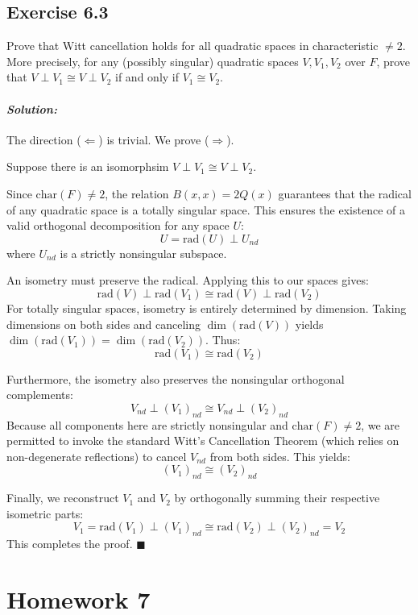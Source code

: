 \documentclass[12pt, a4paper]{article}
\newenvironment{solution}
  {\paragraph{\textit{Solution:}}\par\medskip}
  {\hfill$\blacksquare$\vspace{0.1cm}}
\begin{document}
\subsection*{Exercise 6.3}
Prove that Witt cancellation holds for all quadratic spaces in characteristic $\neq 2$. More precisely, for any (possibly singular) quadratic spaces $V, V_1, V_2$ over $F$, prove that $V \perp V_1 \cong V \perp V_2$ if and only if $V_1 \cong V_2$.
\begin{solution}
The direction ($\Longleftarrow$) is trivial. We prove ($\Longrightarrow$).

Suppose there is an isomorphsim $V \perp V_1 \cong V \perp V_2$.

Since $\mathrm{char}(F) \neq 2$, the relation $B(x,x) = 2Q(x)$ guarantees that the radical of any quadratic space is a totally singular space. This ensures the existence of a valid orthogonal decomposition for any space $U$:
\[ U = \mathrm{rad}(U) \perp U_{nd} \]
where $U_{nd}$ is a strictly nonsingular subspace.

An isometry must preserve the radical. Applying this to our spaces gives:
\[ \mathrm{rad}(V) \perp \mathrm{rad}(V_1) \cong \mathrm{rad}(V) \perp \mathrm{rad}(V_2) \]
For totally singular spaces, isometry is entirely determined by dimension. Taking dimensions on both sides and canceling $\dim(\mathrm{rad}(V))$ yields $\dim(\mathrm{rad}(V_1)) = \dim(\mathrm{rad}(V_2))$. Thus:
\[ \mathrm{rad}(V_1) \cong \mathrm{rad}(V_2) \]

Furthermore, the isometry also preserves the nonsingular orthogonal complements:
\[ V_{nd} \perp (V_1)_{nd} \cong V_{nd} \perp (V_2)_{nd} \]
Because all components here are strictly nonsingular and $\mathrm{char}(F) \neq 2$, we are permitted to invoke the standard Witt's Cancellation Theorem (which relies on non-degenerate reflections) to cancel $V_{nd}$ from both sides. This yields:
\[ (V_1)_{nd} \cong (V_2)_{nd} \]

Finally, we reconstruct $V_1$ and $V_2$ by orthogonally summing their respective isometric parts:
\[ V_1 = \mathrm{rad}(V_1) \perp (V_1)_{nd} \cong \mathrm{rad}(V_2) \perp (V_2)_{nd} = V_2 \]
This completes the proof.
\end{solution}

\section*{Homework 7}
\end{document}
